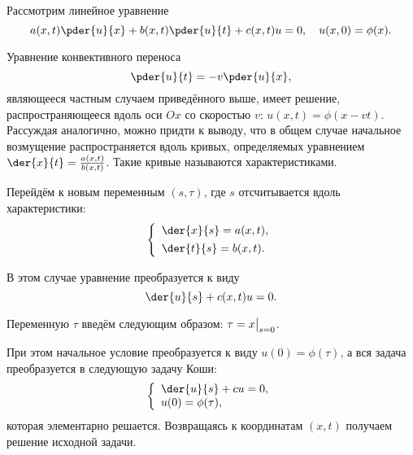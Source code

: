 
Рассмотрим линейное уравнение
\[
    a(x, t)\pder{u}{x} + b(x, t)\pder{u}{t} + c(x, t)u = 0, \quad
    u(x, 0) = \phi(x).
\]

Уравнение конвективного переноса
\[
    \pder{u}{t} = -v\pder{u}{x},
\]
являющееся частным случаем приведённого выше, имеет решение, распространяющееся
вдоль оси \( Ox \) со скоростью \( v \): \( u(x,t) = \phi(x-vt) \). Рассуждая
аналогично, можно придти к выводу, что в общем случае начальное возмущение
распространяется вдоль кривых, определяемых уравнением
\( \der{x}{t} = \frac{a(x,t)}{b(x,t)} \). Такие кривые называются
характеристиками. 

Перейдём к новым переменным \( (s, \tau) \), где \( s \) отсчитывается вдоль
характеристики:
\[
    \left\{ \begin{array}{l}
        \ds \der{x}{s} = a(x, t), \\[.4em]
        \ds \der{t}{s} = b(x, t).
    \end{array} \right.
\]

В этом случае уравнение преобразуется к виду
\[
    \der{u}{s} + c(x, t)u = 0.
\]

Переменную \( \tau \) введём следующим образом: \( \displaystyle \tau = x\bigr|_{s=0} \).

При этом начальное условие преобразуется к виду \( u(0) = \phi(\tau) \), а вся
задача преобразуется в следующую задачу Коши:
\[
    \left\{ \begin{array}{l}
        \ds \der{u}{s} + cu = 0, \\
        u(0) = \phi(\tau),
    \end{array} \right.
\]
которая элементарно решается. Возвращаясь к координатам \( (x, t) \) получаем
решение исходной задачи.
\newpage
